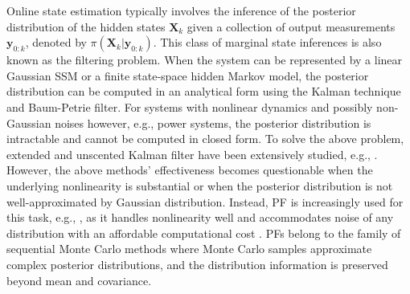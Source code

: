 Online state estimation typically involves the inference of the posterior distribution of the hidden states $\boldsymbol{X}_k$ given a collection of output measurements $\boldsymbol{y}_{0:k}$, denoted by $\pi(\boldsymbol{X}_k | \boldsymbol{y}_{0:k})$. This class of marginal state inferences is also known as the filtering problem. When the system can be represented by a linear Gaussian SSM or a finite state-space hidden Markov model, the posterior distribution can be computed in an analytical form using the Kalman technique and Baum-Petrie filter. For systems with nonlinear dynamics and possibly non-Gaussian noises however, e.g., power systems, the posterior distribution is intractable and cannot be computed in closed form.
To solve the above problem, extended and unscented Kalman filter have been extensively studied, e.g., \cite{Zhao2017,Wang2012}. However, the above methods' effectiveness becomes questionable when the underlying nonlinearity is substantial or when the posterior distribution is not well-approximated by Gaussian distribution. Instead, PF is increasingly used for this task, e.g., \cite{Cui2015}, as it handles nonlinearity well and accommodates noise of any distribution with an affordable computational cost \cite{Kadirkamanathan2002,cappe2007overview}. PFs belong to the family of sequential Monte Carlo methods where Monte Carlo samples approximate complex posterior distributions, and the distribution information is preserved beyond mean and covariance. 

